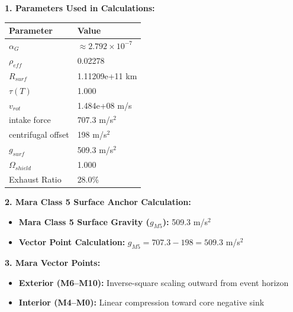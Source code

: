 \documentclass[11pt, a4paper]{article}
\begin{document}
\vspace{0.5em}
\noindent \textbf{1. Parameters Used in Calculations:}
\begin{center}
  \begin{tabular}{|l|l|}
    \hline
    \textbf{Parameter} & \textbf{Value} \\ \hline
    $\alpha_G$ & $\approx 2.792 \times 10^{-7}$ \\ \hline
    $\rho_{eff}$ & 0.02278 \\ \hline
    $R_{surf}$ & 1.11209e+11 km \\ \hline
    $\tau(T)$ & 1.000 \\ \hline
    $v_{rot}$ & 1.484e+08 m/s \\ \hline
    intake force & 707.3 m/s$^2$ \\ \hline
    centrifugal offset & 198 m/s$^2$ \\ \hline
    $g_{surf}$ & 509.3 m/s$^2$ \\ \hline
    $\Omega_{shield}$ & 1.000 \\ \hline
    Exhaust Ratio & 28.0\% \\ \hline
  \end{tabular}
\end{center}

\vspace{0.5em}
\noindent \textbf{2. Mara Class 5 Surface Anchor Calculation:}
\begin{itemize}
  \item \textbf{Mara Class 5 Surface Gravity ($g_{M5}$):} 509.3 m/s$^2$
  \item \textbf{Vector Point Calculation:} $g_{M5} = 707.3 - 198 = 509.3$ m/s$^2$
\end{itemize}

\vspace{0.5em}
\noindent \textbf{3. Mara Vector Points:}
\begin{itemize}
  \item \textbf{Exterior (M6--M10):} Inverse-square scaling outward from event horizon
  \item \textbf{Interior (M4--M0):} Linear compression toward core negative sink
\end{itemize}
\end{document}
